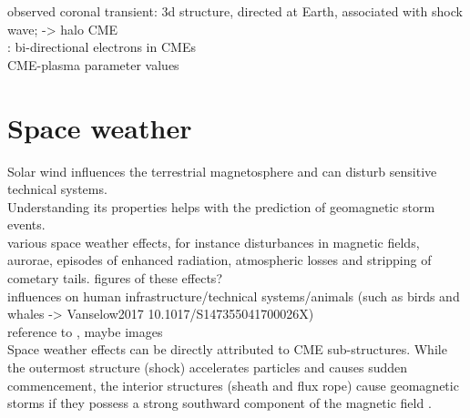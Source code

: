 observed coronal transient: 3d structure, directed at Earth, associated with shock wave; \citep{Howard1982} -> halo CME\\

\citep{Gosling1986}: bi-directional electrons in CMEs\\

CME-plasma parameter values\\




\section{Space weather}
\label{sec:space_weather}

Solar wind influences the terrestrial magnetosphere and can disturb sensitive technical systems.\\
Understanding its properties helps with the prediction of geomagnetic storm events.\\

various space weather effects, for instance disturbances in magnetic fields, aurorae, episodes of enhanced radiation, atmospheric losses and stripping of cometary tails. figures of these effects?\\

influences on human infrastructure/technical systems/animals (such as birds and whales -> Vanselow2017 10.1017/S147355041700026X)\\

reference to \citet{Bothmer2007}, maybe images\\

Space weather effects can be directly attributed to CME sub-structures. While the outermost structure (shock) accelerates particles and causes sudden commencement, the interior structures (sheath and flux rope) cause geomagnetic storms if they possess a strong southward component of the magnetic field \citep{Gopalswamy2016}.\\

